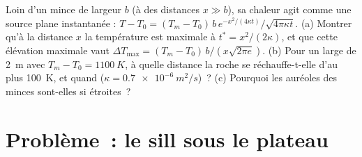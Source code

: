\begin{exercise}[$\star\star\star$]\label{exo:b2:magma-emplacement:12}
Loin d'un  mince de largeur $b$ (à des distances $x \gg b$), sa chaleur agit comme une
source plane instantanée : $T - T_0 = (T_m - T_0)\,b\,e^{-x^2/(4\kappa
t)}/\sqrt{4\pi\kappa t}$. (a) Montrer qu'à la distance $x$ la température est maximale à
$t^* = x^2/(2\kappa)$, et que cette élévation maximale vaut $\Delta T_{\max} = (T_m -
T_0)\,b/(x\sqrt{2\pi e})$. (b) Pour un  large de \qty{2}{m} avec $T_m - T_0 =
\qty{1100}{K}$, à quelle distance la roche se réchauffe-t-elle d'au plus \qty{100}{K}, et
quand ($\kappa = \qty{0.7e-6}{m^2/s}$)~? (c) Pourquoi les auréoles des  minces sont-elles si
étroites~?
\end{exercise}

\section{Problème~: le sill sous le plateau}

